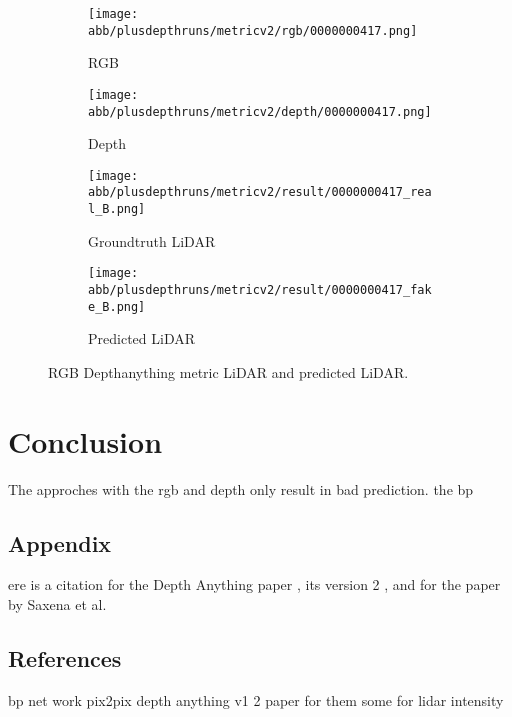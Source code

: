 \begin{figure}[!ht]
	\centering
	
	\begin{subfigure}{0.4\textwidth}
		\centering
		\texttt{[image: abb/plusdepthruns/metricv2/rgb/0000000417.png]}
		\caption{RGB}
		\label{fig:bild1}
	\end{subfigure}
	
	\vspace{1em} %
	
	\begin{subfigure}{0.4\textwidth}
		\centering
		\texttt{[image: abb/plusdepthruns/metricv2/depth/0000000417.png]}
		\caption{Depth}
		\label{fig:bild2}
	\end{subfigure}
	
	\vspace{1em} %
	
	\begin{subfigure}{0.25\textwidth}
		\centering
		\texttt{[image: abb/plusdepthruns/metricv2/result/0000000417\_real\_B.png]}
		\caption{Groundtruth LiDAR}
		\label{fig:bild3}
	\end{subfigure}
	\begin{subfigure}{0.25\textwidth}
		\centering
		\texttt{[image: abb/plusdepthruns/metricv2/result/0000000417\_fake\_B.png]}
		\caption{Predicted LiDAR}
		\label{fig:bild4}
	\end{subfigure}
	
	\caption{RGB Depthanything metric LiDAR and predicted LiDAR.}
	\label{bpplusv2}
\end{figure}
\chapter{Conclusion}
The approches with the rgb and depth only result in bad prediction. the bp 

\section{Appendix}
ere is a citation for the Depth Anything paper \cite{depthanything}, its version 2 \cite{depth_anything_v2}, and for the paper by Saxena et al. \cite{saxena2008depth}

\section{References}
bp net work
pix2pix
depth anything v1 2
paper for them 
some for lidar intensity

